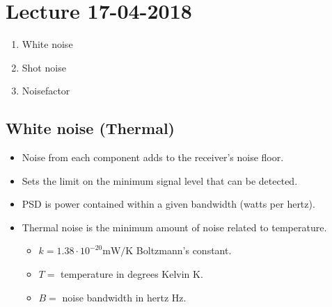 \section{Lecture 17-04-2018}

\begin{enumerate}
	\item White noise
	\item Shot noise
	\item Noisefactor
\end{enumerate}

\noindent{} \vspace{3mm}

\subsection{White noise (Thermal)}
\begin{itemize}
	\item Noise from each component adds to the	receiver's noise floor.
	\item Sets the limit on the minimum signal level that can be detected.
	\item PSD is power contained within a	given bandwidth (watts per hertz).
	\item Thermal noise is the minimum amount of noise related to temperature.
	\begin{itemize}
		\item $k=1.38 \cdot 10^{-20}\si{\milli\watt/\kelvin}$ Boltzmann's constant.
		\item $T=$ temperature in degrees Kelvin \si{\kelvin}.
		\item $B=$ noise bandwidth in hertz \si{\hertz}.
	\end{itemize}
\end{itemize}

